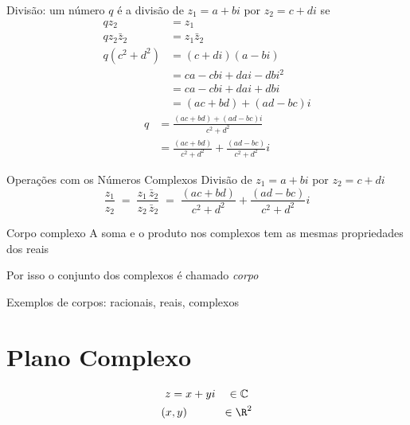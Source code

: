 Divisão: um número $q$ é a divisão de \(z_1=a+bi\) por \(z_2=c+di\) se
\begin{align*}
  q z_2           & = z_1                   \\
  q z_2 \bar{z}_2 & = z_1 \bar{z}_2         \\
  q (c^2 + d^2)   & = (c+di)(a-bi)          \\
                  & = ca -cbi +dai -dbi^2   \\
                  & = ca -cbi +dai +dbi     \\
                  & = (ac + bd) + (ad -bc)i
\end{align*}
\begin{align*}
  q & = \frac{(ac + bd) + (ad -bc)i}{c^2 + d^2}           \\[2mm]
    & = \frac{(ac + bd)}{c^2 + d^2} + \frac{(ad -bc)}{c^2 + d^2}i
\end{align*}

Operações com os Números Complexos
Divisão de \(z_1=a+bi\) por \(z_2=c+di\)
\[
  \frac{z_1}{z_2}
  \;=\; \frac{z_1\,\bar{z}_2}{z_2\,\bar{z}_2}
  \;=\; \frac{(ac + bd)}{c^2 + d^2} + \frac{(ad -bc)}{c^2 + d^2}i
\]

Corpo complexo
A soma e o produto nos complexos tem as mesmas propriedades dos reais

Por isso o conjunto dos complexos é chamado \emph{corpo}

Exemplos de corpos: racionais, reais, complexos

%

\section{Plano Complexo}

\begin{gather*}
  z = x + yi \quad          \in \mathbb{C} \\
  (x, y)     \hspace{7.2ex} \in \R^2
\end{gather*}


